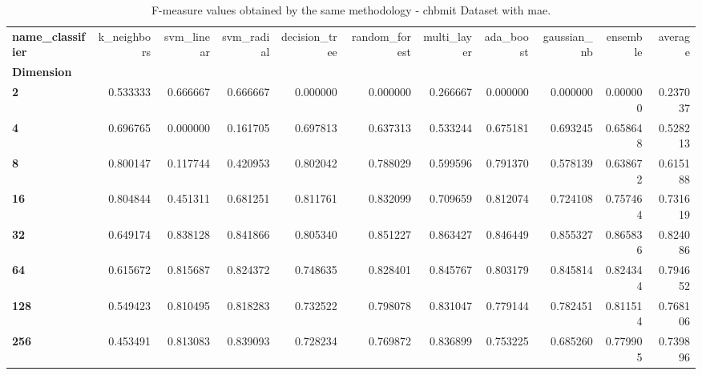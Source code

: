 \begin{table}
\centering
\caption{F-measure values obtained by the same methodology - chbmit Dataset with mae.}
\label{f-measure_chbmit_mae-reproduction}
\begin{tabular}{lrrrrrrrrrr}
\toprule
\textbf{name\_classifier} &  k\_neighbors &  svm\_linear &  svm\_radial &  decision\_tree &  random\_forest &  multi\_layer &  ada\_boost &  gaussian\_nb &  ensemble &   average \\
\textbf{Dimension} &              &             &             &                &                &              &            &              &           &           \\
\midrule
\textbf{2        } &     0.533333 &    0.666667 &    0.666667 &       0.000000 &       0.000000 &     0.266667 &   0.000000 &     0.000000 &  0.000000 &  0.237037 \\
\textbf{4        } &     0.696765 &    0.000000 &    0.161705 &       0.697813 &       0.637313 &     0.533244 &   0.675181 &     0.693245 &  0.658648 &  0.528213 \\
\textbf{8        } &     0.800147 &    0.117744 &    0.420953 &       0.802042 &       0.788029 &     0.599596 &   0.791370 &     0.578139 &  0.638672 &  0.615188 \\
\textbf{16       } &     0.804844 &    0.451311 &    0.681251 &       0.811761 &       0.832099 &     0.709659 &   0.812074 &     0.724108 &  0.757464 &  0.731619 \\
\textbf{32       } &     0.649174 &    0.838128 &    0.841866 &       0.805340 &       0.851227 &     0.863427 &   0.846449 &     0.855327 &  0.865836 &  0.824086 \\
\textbf{64       } &     0.615672 &    0.815687 &    0.824372 &       0.748635 &       0.828401 &     0.845767 &   0.803179 &     0.845814 &  0.824344 &  0.794652 \\
\textbf{128      } &     0.549423 &    0.810495 &    0.818283 &       0.732522 &       0.798078 &     0.831047 &   0.779144 &     0.782451 &  0.811514 &  0.768106 \\
\textbf{256      } &     0.453491 &    0.813083 &    0.839093 &       0.728234 &       0.769872 &     0.836899 &   0.753225 &     0.685260 &  0.779905 &  0.739896 \\
\bottomrule
\end{tabular}
\end{table}
